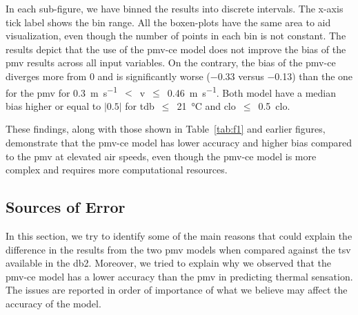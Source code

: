 In each sub-figure, we have binned the results into discrete intervals.
The x-axis tick label shows the bin range.
All the boxen-plots have the same area to aid visualization, even though the number of points in each bin is not constant.
The results depict that the use of the \ac{pmv-ce} model does not improve the bias of the \ac{pmv} results across all input variables.
On the contrary, the bias of the \ac{pmv-ce} diverges more from 0 and is significantly worse (\num{-.33} versus \num{-0.13}) than the one for the \ac{pmv} for \qty{0.3}{\m\per\s}~$<$~\ac{v}~$\leq$~\qty{0.46}{\m\per\s}.
Both model have a median bias higher or equal to $\lvert0.5\lvert$ for \ac{tdb}~$\leq$~\qty{21}{\celsius} and \ac{clo}~$\leq$~\qty{.5}{clo}.

These findings, along with those shown in Table~\ref{tab:f1} and earlier figures, demonstrate that the \ac{pmv-ce} model has lower accuracy and higher bias compared to the \ac{pmv} at elevated air speeds, even though the \ac{pmv-ce} model is more complex and requires more computational resources.

\subsection{Sources of Error}\label{subsec:sources-of-error}
In this section, we try to identify some of the main reasons that could explain the difference in the results from the two \ac{pmv} models when compared against the \ac{tsv} available in the \ac{db2}.
Moreover, we tried to explain why we observed that the \ac{pmv-ce} model has a lower accuracy than the \ac{pmv} in predicting thermal sensation.
The issues are reported in order of importance of what we believe may affect the accuracy of the model.

